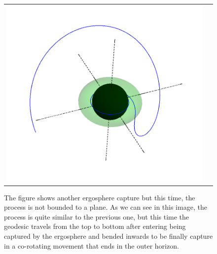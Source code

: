\begin{figure}
\centering
 \hspace*{-0.05\textwidth}
\begin{tabular}{cc}
\centerline{\includegraphics[width=1\textwidth]{img/Chapter4/Caputure.png}}
\end{tabular}
\caption{The figure shows another ergosphere capture but this time, the process is not bounded to a plane. As we can see in this image, the process is quite similar to the previous one, but this time the geodesic travels from the top to bottom after entering being captured by the ergosphere and bended inwards to be finally capture in a co-rotating movement that ends in the outer horizon.}
\end{figure}


\clearpage


